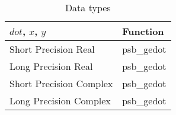 \begin{table}[h]
\begin{center}
\begin{tabular}{ll}
\hline
$dot$, $x$, $y$ & {\bf Function}\\
\hline
Short Precision Real & psb\_gedot \\
Long Precision Real & psb\_gedot \\
Short Precision Complex & psb\_gedot \\	
Long Precision Complex & psb\_gedot \\	
\hline
\end{tabular}
\end{center}
\caption{Data types\label{tab:f90dot}}
\end{table}

